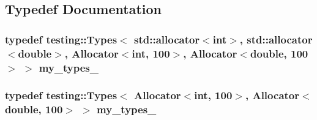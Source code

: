 \subsection{Typedef Documentation}
\hypertarget{TestAllocator_8c_09_09_a13869bd8140d5f03f67a74c18b4a9483}{
\subsubsection[{my\-\_\-types\-\_\-1}]{\setlength{\rightskip}{0pt plus 5cm}typedef testing\-::\-Types$<$ std\-::allocator$<$int$>$, std\-::allocator$<$double$>$, {\bf Allocator}$<$int, 100$>$, {\bf Allocator}$<$double, 100$>$ $>$ {\bf my\-\_\-types\-\_}}}\label{TestAllocator_8c_09_09_a13869bd8140d5f03f67a74c18b4a9483}
\hypertarget{TestAllocator_8c_09_09_ae8c7ebc24b7c1269b8c59135bef34e20}{
\subsubsection[{my\-\_\-types\-\_\-2}]{\setlength{\rightskip}{0pt plus 5cm}typedef testing\-::\-Types$<$ {\bf Allocator}$<$int, 100$>$, {\bf Allocator}$<$double, 100$>$ $>$ {\bf my\-\_\-types\-\_}}}\label{TestAllocator_8c_09_09_ae8c7ebc24b7c1269b8c59135bef34e20}


